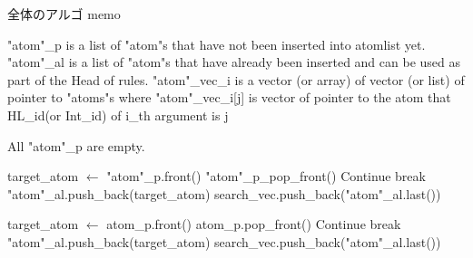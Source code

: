 \begin{algorithm}
\caption{全体のアルゴ memo}
\label{alg:overall}
\begin{algorithmic}[1]
    \scriptsize

\Require {}
    \State "atom"\_p is a list of "atom"s that have not been inserted into atomlist yet.   
    \State "atom"\_al is a list of "atom"s that have already been inserted and can be used as part of the Head of rules.
    \State "atom"\_vec\_i is a vector (or array) of vector (or list) of pointer to "atoms"s 
    where "atom"\_vec\_i[j] is vector of pointer to the atom that HL\_id(or Int\_id) of i\_th argument is j

\Ensure
    All "atom"\_p are empty.

        \State target\_atom $\gets$ "atom"\_p.front()
        \State "atom"\_p\_pop\_front()
                \State Continue
            \EndIf
            \State break
        \EndFor
        \State "atom"\_al.push\_back(target\_atom)
            \State search\_vec.push\_back("atom"\_al.last())
        \EndFor
    \EndIf  
\EndFor

            \State target\_atom $\gets$ atom\_p.front()
            \State atom\_p.pop\_front()
                    \State Continue
                \EndIf
                \State break
            \EndFor
            \State "atom"\_al.push\_back(target\_atom)
                \State search\_vec.push\_back("atom"\_al.last())
            \EndFor
        \EndIf  
    \EndFor
\EndWhile
\EndProcedure

\end{algorithmic}
\end{algorithm}

